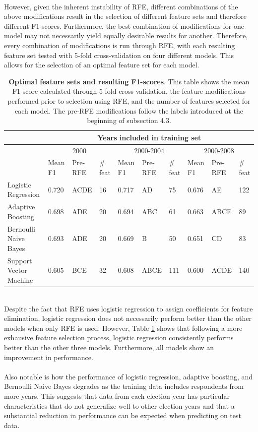 \documentclass{article}
\begin{document}
	\hfill \\
	However, given the inherent instability of RFE, different combinations of the above modifications result in the selection of different feature sets and therefore different F1-scores. Furthermore, the best combination of modifications for one model may not necessarily yield equally desirable results for another. Therefore, every combination of modifications is run through RFE, with each resulting feature set tested with 5-fold cross-validation on four different models. This allows for the selection of an optimal feature set for each model.
	
	\begin{table}[h]
		\begin{tabular}{|m{4cm}|m{1cm}|m{1cm}|m{0.8cm}|m{1cm}|m{1cm}|m{0.8cm}|m{1cm}|m{1cm}|m{0.8cm}|}
			\hline &
			\multicolumn{9}{|c|}{Years included in training set} \\
			\hline &
			\multicolumn{3}{|c|}{2000} &
			\multicolumn{3}{|c|}{2000-2004} &
			\multicolumn{3}{|c|}{2000-2008} \\
			\hline
			& Mean F1 & Pre-RFE & \# feat & Mean F1 & Pre-RFE & \# feat & Mean F1 & Pre-RFE & \# feat \\
			\hline
			Logistic Regression & 0.720 & ACDE & 16 & 0.717 & AD & 75 & 0.676 & AE & 122
			\\ \hline
			Adaptive Boosting & 0.698 & ADE & 20 & 0.694 & ABC & 61 & 0.663 & ABCE & 89
			\\ \hline
			Bernoulli Naive Bayes & 0.693 & ADE & 20 & 0.669 & B & 50 & 0.651 & CD & 83
			\\ \hline
			Support Vector Machine & 0.605 & BCE & 32 & 0.608 & ABCE & 111 & 0.600 & ACDE & 140
			\\ \hline
		\end{tabular}
		\caption{\textbf{Optimal feature sets and resulting F1-scores}. This table shows the mean F1-score calculated through 5-fold cross validation, the feature modifications performed prior to selection using RFE, and the number of features selected for each model. The pre-RFE modifications follow the labels introduced at the beginning of subsection 4.3.}
		\label{table:rfe_combination}
	\end{table}
	\hfill \\
	Despite the fact that RFE uses logistic regression to assign coefficients for feature elimination, logistic regression does not necessarily perform better than the other models when only RFE is used. However, Table \ref{table:rfe_combination} shows that following a more exhausive feature selection process, logistic regression consistently performs better than the other three models. Furthermore, all models show an improvement in performance.
	\\\\
	Also notable is how the performance of logistic regression, adaptive boosting, and Bernoulli Naive Bayes degrades as the training data includes respondents from more years. This suggests that data from each election year has particular characteristics that do not generalize well to other election years and that a substantial reduction in performance can be expected when predicting on test data.
	
\end{document}
